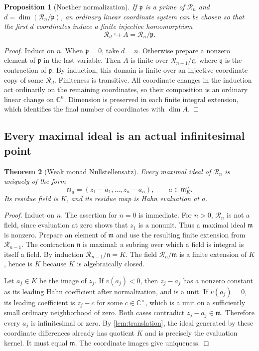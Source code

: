 \documentclass[11pt]{article}
\newtheorem{theorem}{Theorem}[section]
\newtheorem{proposition}[theorem]{Proposition}
\theoremstyle{definition}
\newcommand{\C}{\mathbb C}
\newcommand{\RR}{\mathscr R}
\newcommand{\mm}{\mathfrak m}
\newcommand{\pp}{\mathfrak p}
\begin{document}
\begin{proposition}[Noether normalization]\label{prop:normalization}
If $\pp$ is a prime of $\RR_n$ and $d=\dim(\RR_n/\pp)$, an ordinary linear coordinate system can be chosen so that the first $d$ coordinates induce a finite injective homomorphism
\begin{equation}\label{eq:normalization}
 \RR_d\hookrightarrow A=\RR_n/\pp.
\end{equation}
\end{proposition}
\begin{proof}
Induct on $n$. When $\pp=0$, take $d=n$. Otherwise prepare a nonzero element of $\pp$ in the last variable. Then $A$ is finite over $\RR_{n-1}/\mathfrak q$, where $\mathfrak q$ is the contraction of $\pp$. By induction, this domain is finite over an injective coordinate copy of some $\RR_d$. Finiteness is transitive. All coordinate changes in the induction act ordinarily on the remaining coordinates, so their composition is an ordinary linear change on $\C^n$. Dimension is preserved in each finite integral extension, which identifies the final number of coordinates with $\dim A$.
\end{proof}

\subsection{Every maximal ideal is an actual infinitesimal point}
\begin{theorem}[Weak monad Nullstellensatz]\label{thm:weaknull}
Every maximal ideal of $\RR_n$ is uniquely of the form
\[
 \mm_a=(z_1-a_1,\ldots,z_n-a_n),\qquad a\in\mm_K^n.
\]
Its residue field is $K$, and its residue map is Hahn evaluation at $a$.
\end{theorem}
\begin{proof}
Induct on $n$. The assertion for $n=0$ is immediate. For $n>0$, $\RR_n$ is not a field, since evaluation at zero shows that $z_1$ is a nonunit. Thus a maximal ideal $\mathfrak m$ is nonzero. Prepare an element of $\mathfrak m$ and use the resulting finite extension from $\RR_{n-1}$. The contraction $\mathfrak n$ is maximal: a subring over which a field is integral is itself a field. By induction $\RR_{n-1}/\mathfrak n=K$. The field $\RR_n/\mathfrak m$ is a finite extension of $K$, hence is $K$ because $K$ is algebraically closed.

Let $a_j\in K$ be the image of $z_j$. If $v(a_j)<0$, then $z_j-a_j$ has a nonzero constant as its leading Hahn coefficient after normalization, and is a unit. If $v(a_j)=0$, its leading coefficient is $z_j-c$ for some $c\in\C^\times$, which is a unit on a sufficiently small ordinary neighborhood of zero. Both cases contradict $z_j-a_j\in\mathfrak m$. Therefore every $a_j$ is infinitesimal or zero. By \cref{lem:translation}, the ideal generated by these coordinate differences already has quotient $K$ and is precisely the evaluation kernel. It must equal $\mathfrak m$. The coordinate images give uniqueness.
\end{proof}
\end{document}
